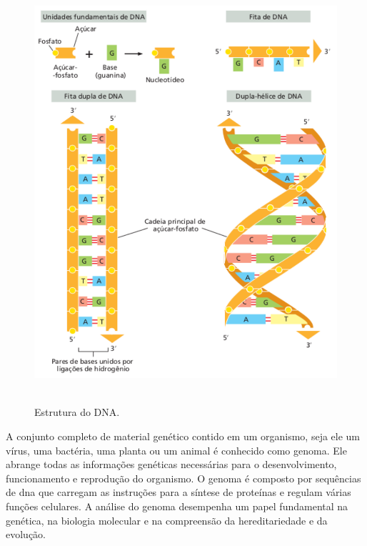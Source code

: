 \begin{figure}[htb]
  \centering
  \caption{Estrutura do DNA.}
  \includegraphics[scale=0.6]{figuras/estruturaDNA_02.pdf}
  ~\label{fig:estruturaDNA}
\end{figure}

A conjunto completo de material genético contido em um organismo, seja ele um vírus, uma bactéria, uma planta ou um animal é conhecido como genoma. Ele abrange todas as informações genéticas necessárias para o desenvolvimento, funcionamento e reprodução do organismo. O genoma é composto por sequências de \gls{dna} que carregam as instruções para a síntese de proteínas e regulam várias funções celulares. A análise do genoma desempenha um papel fundamental na genética, na biologia molecular e na compreensão da hereditariedade e da evolução.~\cite{alberts_biologia_2017}


